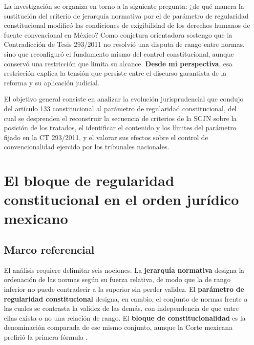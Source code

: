 \documentclass[
  spanish,
  letterpaper, oneside
]{article}
\begin{document}
La investigación se organiza en torno a la siguiente pregunta: ¿de qué manera la sustitución del criterio de jerarquía normativa por el de parámetro de regularidad constitucional modificó las condiciones de exigibilidad de los derechos humanos de fuente convencional en México? Como conjetura orientadora sostengo que la Contradicción de Tesis 293/2011 no resolvió una disputa de rango entre normas, sino que reconfiguró el fundamento mismo del control constitucional, aunque conservó una restricción que limita su alcance. \textbf{Desde mi perspectiva}, esa restricción explica la tensión que persiste entre el discurso garantista de la reforma y su aplicación judicial.

El objetivo general consiste en analizar la evolución jurisprudencial que condujo del artículo 133 constitucional al parámetro de regularidad constitucional, del cual se desprenden el reconstruir la secuencia de criterios de la SCJN sobre la posición de los tratados, el identificar el contenido y los límites del parámetro fijado en la CT 293/2011, y el valorar sus efectos sobre el control de convencionalidad ejercido por los tribunales nacionales.

\section{El bloque de regularidad constitucional en el orden jurídico mexicano}

\subsection{Marco referencial}

El análisis requiere delimitar seis nociones. La \textbf{jerarquía normativa} designa la ordenación de las normas según su fuerza relativa, de modo que la de rango inferior no puede contradecir a la superior sin perder validez. El \textbf{parámetro de regularidad constitucional} designa, en cambio, el conjunto de normas frente a las cuales se contrasta la validez de las demás, con independencia de que entre ellas exista o no una relación de rango. El \textbf{bloque de constitucionalidad} es la denominación comparada de ese mismo conjunto, aunque la Corte mexicana prefirió la primera fórmula \citep{scjnIijCT293y2017}.
\end{document}
